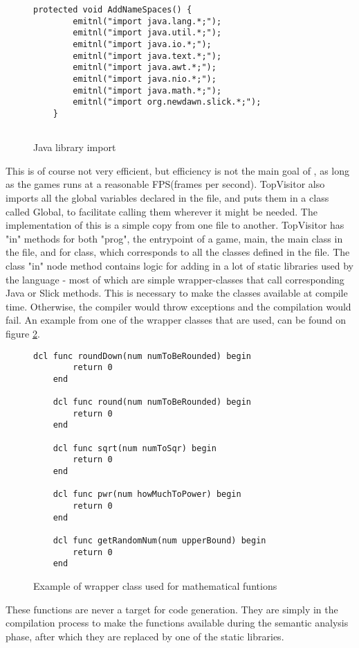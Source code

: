 \begin{figure}[H]
    \centering
    \begin{lstlisting}[style=gglang]
    protected void AddNameSpaces() {
        emitnl("import java.lang.*;");
        emitnl("import java.util.*;");
        emitnl("import java.io.*;");
        emitnl("import java.text.*;");
        emitnl("import java.awt.*;");
        emitnl("import java.nio.*;");
        emitnl("import java.math.*;");
        emitnl("import org.newdawn.slick.*;");
    }
    
    \end{lstlisting}
    \caption{Java library import}\label{fig:javaimport}
\end{figure}

This is of course not very efficient, but efficiency is not the main goal of \lang{}, as long as the games runs at a reasonable FPS(frames per second).
TopVisitor also imports all the global variables declared in the \lang{} file, and puts them in a class called Global, to facilitate calling them wherever it might be needed. The implementation of this is a simple copy from one file to another. 
TopVisitor has "in"  methods for both "prog", the entrypoint of a game, main, the main class in the \lang{} file, and for class, which corresponds to all the classes defined in the \lang{} file. 
The class "in" node method contains logic for adding in a lot of static libraries used by the language - most of which are simple wrapper-classes that call corresponding Java or Slick methods. This is necessary to make the classes available at compile time. Otherwise, the \lang{} compiler would throw exceptions and the compilation would fail. An example from one of the wrapper classes that are used, can be found on figure \ref{fig:wrapperClass}.

\begin{figure}[H]
\centering
    \begin{lstlisting}[style=gglang]
    dcl func roundDown(num numToBeRounded) begin
        return 0
    end

    dcl func round(num numToBeRounded) begin
        return 0
    end

    dcl func sqrt(num numToSqr) begin
        return 0
    end

    dcl func pwr(num howMuchToPower) begin
        return 0
    end

    dcl func getRandomNum(num upperBound) begin
        return 0
    end
    \end{lstlisting}
    \caption{Example of wrapper class used for mathematical funtions}\label{fig:wrapperClass}
\end{figure}
These functions are never a target for code generation. They are simply in the compilation process to make the functions available during the semantic analysis phase, after which they are replaced by one of the static libraries.

